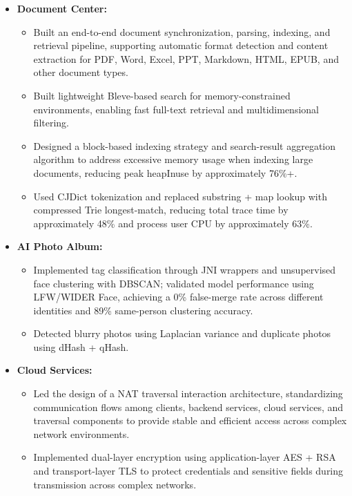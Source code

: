 \documentclass{resume}
\begin{document}
\begin{itemize}

    \item \textbf{Document Center:}
    \begin{itemize}
        \item Built an end-to-end document synchronization, parsing, indexing, and retrieval pipeline, supporting automatic format detection and content extraction for PDF, Word, Excel, PPT, Markdown, HTML, EPUB, and other document types.
        \item Built lightweight Bleve-based search for memory-constrained environments, enabling fast full-text retrieval and multidimensional filtering.
        \item Designed a block-based indexing strategy and search-result aggregation algorithm to address excessive memory usage when indexing large documents, reducing peak heapInuse by approximately 76\%+.
        \item Used CJDict tokenization and replaced substring + map lookup with compressed Trie longest-match, reducing total trace time by approximately 48\% and process user CPU by approximately 63\%.
    \end{itemize}

    \item \textbf{AI Photo Album:}
    \begin{itemize}
        \item Implemented tag classification through JNI wrappers and unsupervised face clustering with DBSCAN; validated model performance using LFW/WIDER Face, achieving a 0\% false-merge rate across different identities and 89\% same-person clustering accuracy.
        \item Detected blurry photos using Laplacian variance and duplicate photos using dHash + qHash.
    \end{itemize}

    \item \textbf{Cloud Services:}
    \begin{itemize}
        \item Led the design of a NAT traversal interaction architecture, standardizing communication flows among clients, backend services, cloud services, and traversal components to provide stable and efficient access across complex network environments.
        \item Implemented dual-layer encryption using application-layer AES + RSA and transport-layer TLS to protect credentials and sensitive fields during transmission across complex networks.
    \end{itemize}


\end{itemize}
\end{document}
